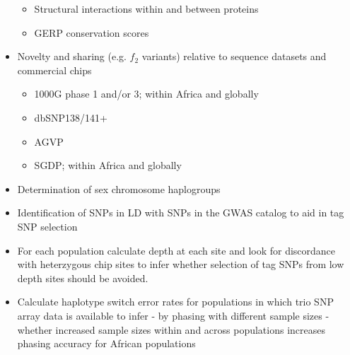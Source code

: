 \begin{itemize}
\begin{itemize}
   \item{Structural interactions within and between proteins
   }
   \item{GERP conservation scores}
  \end{itemize}
 \item Novelty and sharing (e.g. $f_2$ variants) relative to sequence datasets and commercial chips
 \begin{itemize}
  \item 1000G phase 1 and/or 3; within Africa and globally
  \item dbSNP138/141+
  \item AGVP
  \item SGDP; within Africa and globally
 \end{itemize}
 \item{Determination of sex chromosome haplogroups
 }
 \item Identification of SNPs in LD with SNPs in the GWAS catalog to aid in tag SNP selection
 \item For each population calculate depth at each site and look for discordance with heterzygous chip sites to infer whether selection of tag SNPs from low depth sites should be avoided.
 \item {Calculate haplotype switch error rates for populations in which trio SNP array data is available to infer - by phasing with different sample sizes - whether increased sample sizes within and across populations increases phasing accuracy for African populations
 }
\end{itemize}



